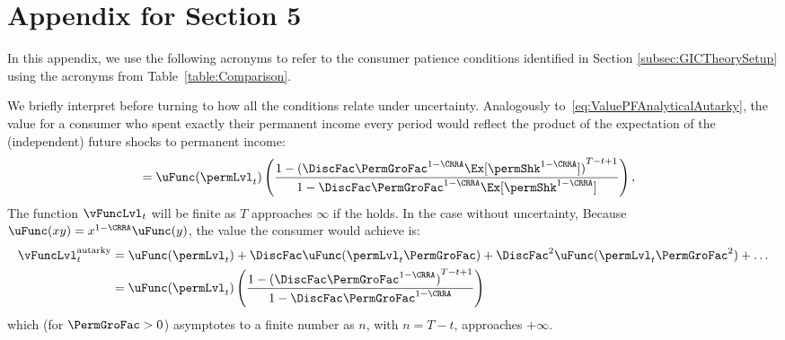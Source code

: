 \documentclass[\econtexRoot/BufferStockTheory]{subfiles}
\begin{document}
\let\TableWidth\relax
{\newlength\TableWidth}

\hypertarget{ApndxLiqConstr}{}
\section{Appendix for Section 5}\label{sec:ApndxLiqConstr}

In this appendix, we use the following acronyms to refer to the consumer patience conditions identified in Section \ref{subsec:GICTheorySetup} using the acronyms from Table~\ref{table:Comparison}. 

\hypertarget{Autarky-Value}{}
We briefly interpret {\FVAC} before turning to how all the conditions relate under uncertainty. Analogously to~\eqref{eq:ValuePFAnalyticalAutarky}, the value for a consumer who spent exactly their permanent income every period would reflect the product of the expectation of the (independent) future shocks to permanent income:\hypertarget{uInvEuPermShkDefn}{}
\begin{align*}
             & = \uFunc(\permLvl_{t})\left(\frac{1-{(\DiscFac \PermGroFac^{1-\CRRA}\Ex[\permShk^{1-\CRRA}])}^{T-t+1}}{1-\DiscFac \PermGroFac^{1-\CRRA} \Ex[\permShk^{1-\CRRA}]}\right),
\end{align*}
%
The function $\vFuncLvl_{t}$ will be finite as $T$ approaches $\infty$ if the {\FVAC} holds.
In the case without uncertainty, Because $\uFunc(xy) = x^{1-\CRRA}\uFunc(y)$, the value the consumer would achieve is: 
%
%
%
\begin{equation}\begin{gathered}\begin{aligned}  
      \vFuncLvl_{t}^{\text{autarky}}  & = \uFunc(\permLvl_{t})+\DiscFac \uFunc(\permLvl_{t}\PermGroFac)+\DiscFac^{2} \uFunc(\permLvl_{t} \PermGroFac^{2})+\ldots \label{eq:ValuePFAnalyticalAutarky}
      \\  & = \uFunc(\permLvl_{t})\left(\frac{1-{(\DiscFac \PermGroFac^{1-\CRRA})}^{T-t+1}}{1-\DiscFac \PermGroFac^{1-\CRRA}}\right) \notag
    \end{aligned}\end{gathered}\end{equation}
which (for $\PermGroFac>0$) asymptotes to a finite number as $n$, with $n=T-t$, approaches $+\infty$.
\end{document}
